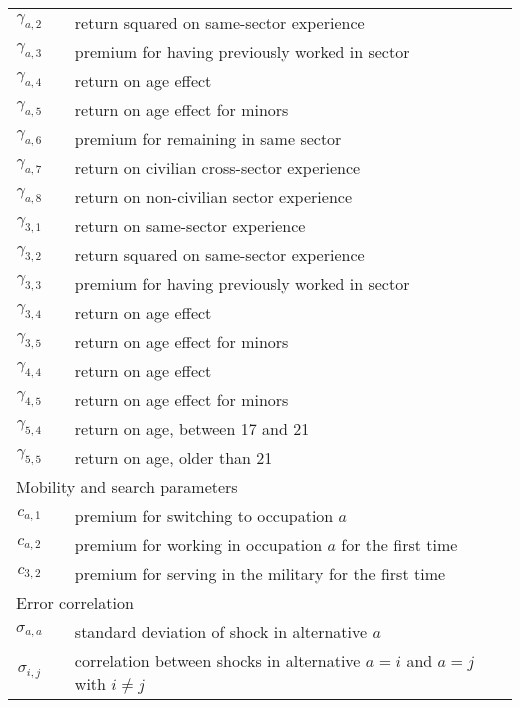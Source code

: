 \begin{ThreePartTable}
\begin{longtable}{@{}cll@{}}
		$\gamma_{a,2}$       &  & return squared on same-sector experience         								\\
		$\gamma_{a,3}$       &  & premium for having previously worked in sector        							   \\
		$\gamma_{a,4}$       &  & return on age effect                             											     \\
		$\gamma_{a,5}$       &  & return on age effect for minors               										\\
		$\gamma_{a,6}$       &  & premium for remaining in same sector              								   \\
		$\gamma_{a,7}$       &  & return on civilian cross-sector experience       								    \\
		$\gamma_{a,8}$       &  & return on non-civilian sector experience       										 \\
		$\gamma_{3,1}$       &  & return on same-sector experience                 									  \\
		$\gamma_{3,2}$       &  & return squared on same-sector experience    										 \\
		$\gamma_{3,3}$       &  & premium for having previously worked in sector   										\\
		$\gamma_{3,4}$       &  & return on age effect                             												 \\
		$\gamma_{3,5}$       &  & return on age effect for minors              	   										\\
		$\gamma_{4,4}$       &  & return on age effect                             												 \\
		$\gamma_{4,5}$       &  & return on age effect for minors                  										\\
		$\gamma_{5,4}$       &  & return on age, between 17 and 21                 	  									   \\
		$\gamma_{5,5}$       &  & return on age, older than 21							   										\\[7.5pt] \midrule
		\multicolumn{3}{l}{Mobility and search parameters}          													  \\ \midrule
		$c_{a,1}$            &  & premium for switching to occupation $a$           									   \\
		$c_{a,2}$            &  & premium for working in occupation $a$ for the first time         										  \\
		$c_{3,2}$            &  & premium for serving in the military for the first time								                                            	  \\[7.5pt] \midrule
		\multicolumn{3}{l}{Error correlation}          													  									\\ \midrule
		$\sigma_{a,a}$	&	& standard deviation of shock in alternative $a$									\\
		$\sigma_{i,j}$ &	& correlation between shocks in alternative $a = i$ and $a=j$ with $i \neq j$ \\

	\end{longtable}
\end{ThreePartTable}
